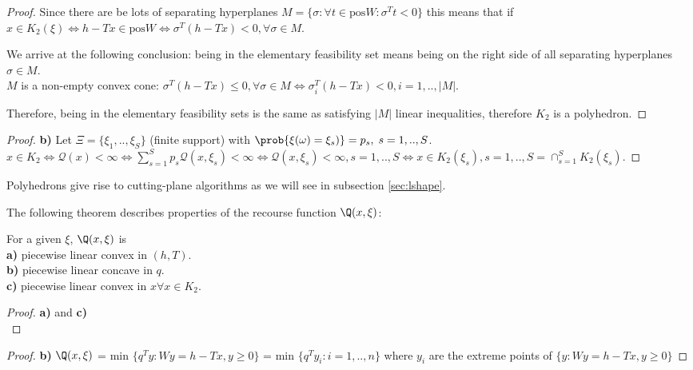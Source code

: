 \begin{proof}
Since there are be lots of separating hyperplanes $M = \{ \sigma : \forall t \in \text{pos}W :
\sigma^T t < 0\}$ this means that if $x\in K_2(\xi) \Leftrightarrow h-Tx \in \text{pos}W
\Leftrightarrow \sigma^T(h-Tx) < 0, \forall \sigma \in M$.

We arrive at the following conclusion: being in the elementary feasibility set means
being on the right side of all separating hyperplanes $\sigma \in M$.\\

$M$ is a non-empty convex cone: $\sigma^T (h-Tx) \leq 0, \forall \sigma \in M \Leftrightarrow
\sigma_i^T(h-Tx) < 0, i=1,..,|M|$.

Therefore, being in the elementary feasibility sets is the same as satisfying $|M|$ linear
inequalities, therefore $K_2$ is a polyhedron.
\end{proof}

\begin{proof}{\bf b)}
Let $\Xi = \{\xi_1, .., \xi_S\}$ (finite support) with $\prob{\xi(\omega)=\xi_s)} = p_s,\; s=1,..,S$.
$x\in K_2 \Leftrightarrow \mathcal{Q}(x) < \infty \Leftrightarrow \sum_{s=1}^S p_s
\mathcal{Q}(x,\xi_s) < \infty \Leftrightarrow \mathcal{Q}(x,\xi_s) < \infty, s=1,..,S
\Leftrightarrow x\in K_2(\xi_s), s=1,..,S = \cap_{s=1}^S K_2(\xi_s)$.
\end{proof}

Polyhedrons give rise to cutting-plane algorithms as we will see in subsection \ref{sec:lshape}.

The following theorem describes properties of the recourse function $\Q(x,\xi)$:

\begin{thm}\hfill\break
For a given $\xi$, $\Q(x,\xi)$ is\\
{\bf a)} piecewise linear convex in $(h,T)$.\\
{\bf b)} piecewise linear concave in $q$.\\
{\bf c)} piecewise linear convex in $x \forall x\in K_2$.
\end{thm}

\begin{proof}{\bf a)} and {\bf c)}\\

\end{proof}

\begin{proof}{\bf b)}
$\Q(x,\xi)$ = min $\{q^Ty : Wy = h-Tx, y\geq0 \}$
            = min $\{q^Ty_i : i=1,..,n\}$ where $y_i$ are the extreme points of $\{ y:  Wy = h-Tx, y\geq0 \}$ 
\end{proof}



